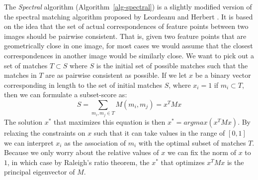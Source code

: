 The \emph{Spectral} algorithm (Algorithm~\ref{alg-spectral}) is a 
slightly modified version of the spectral matching algorithm proposed by
Leordeanu and Herbert \cite{leordeanu2005spectral}. It is based on the 
idea that the set of actual correspondences of feature points between 
two images should be pairwise consistent. That is, given two feature 
points that are geometrically close in one image, for most cases we 
would assume that the closest correspondences in another image would be 
similarly close. We want to pick out a set of matches $T \subset S$ 
where $S$ is the initial set of possible matches such that the matches 
in $T$ are as pairwise consistent as possible. If we let $x$ be a binary 
vector corresponding in length to the set of initial matches $S$, where 
$x_i = 1$ if $m_i \subset T$, then we can formulate a subset-score as:
\begin{equation*}
	S = \sum_{m_i, m_j \in T} M(m_i, m_j) = x^TMx
\end{equation*}
The solution $x^{*}$ that maximizes this equation is then $x^{*} = 
argmax(x^TMx)$. By relaxing the constraints on $x$ such that it can take
values in the range of $\left[0, 1\right]$ we can interpret $x_i$ as the
association of $m_i$ with the optimal subset of matches $T$. Because we 
only worry about the relative values of $x$ we can fix the norm of $x$ 
to $1$, in which case by Raleigh's ratio theorem, the $x^{*}$ that 
optimizes $x^TMx$ is the principal eigenvector of $M$.

